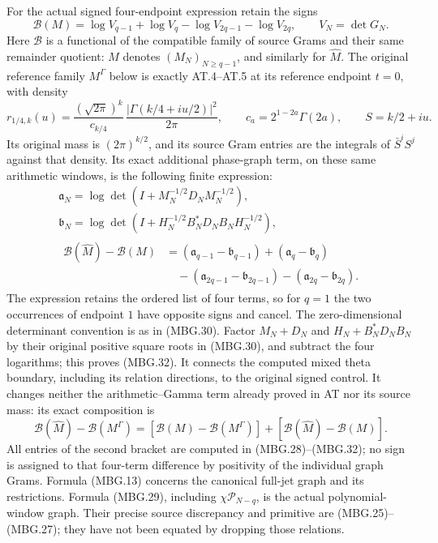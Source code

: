 For the actual signed four-endpoint expression retain the signs
\[
 \mathcal B(M)=
 \log V_{q-1}+\log V_q
                  -\log V_{2q-1}-\log V_{2q},\qquad V_N=\det G_N .
 \tag{MBG.31}\label{eq:mbg-signed-four}
\]
Here \(\mathcal B\) is a functional of the compatible family of
source Grams and their same remainder quotient: \(M\) denotes
\((M_N)_{N\ge q-1}\), and similarly for \(\widehat M\).
The original reference family \(M^\Gamma\) below is exactly
AT.4--AT.5 at its reference endpoint \(t=0\), with density
\[
 r_{1/4,k}(u)=\frac{(\sqrt{2\pi})^k}{c_{k/4}}\,
      \frac{|\Gamma(k/4+iu/2)|^2}{2\pi},
 \qquad c_a=2^{1-2a}\Gamma(2a),\qquad S=k/2+iu.
 \tag{MBG.31a}\label{eq:mbg-Gamma-reference}
\]
Its original mass is \((2\pi)^{k/2}\), and its source Gram entries
are the integrals of \(\bar S^iS^j\) against that density.
Its exact additional phase-graph term, on these same arithmetic
windows, is the following finite expression:
\[
 \begin{gathered}
 \mathfrak a_N=\log\det(I+M_N^{-1/2}D_NM_N^{-1/2}),\\
 \mathfrak b_N=\log\det(I+H_N^{-1/2}B_N^*D_NB_NH_N^{-1/2}),\\
 \begin{aligned}
 \mathcal B(\widehat M)-\mathcal B(M)
 &= (\mathfrak a_{q-1}-\mathfrak b_{q-1})
       +(\mathfrak a_q-\mathfrak b_q)\\
 &\quad-(\mathfrak a_{2q-1}-\mathfrak b_{2q-1})
       -(\mathfrak a_{2q}-\mathfrak b_{2q}).
 \end{aligned}
 \end{gathered}
 \tag{MBG.32}\label{eq:mbg-four-exact}
\]
The expression retains the ordered list of four terms, so for \(q=1\) the
two occurrences of endpoint \(1\) have opposite signs and cancel.
The zero-dimensional determinant convention is as in (MBG.30).
Factor \(M_N+D_N\) and
\(H_N+B_N^*D_NB_N\) by their original positive square roots in
(MBG.30), and subtract the four logarithms; this proves (MBG.32).
It connects the computed mixed theta boundary, including its
relation directions, to the original signed control.
It changes neither the arithmetic--Gamma term already proved in AT
nor its source mass: its exact composition is
\[
 \mathcal B(\widehat M)-\mathcal B(M^\Gamma)
 =[\mathcal B(M)-\mathcal B(M^\Gamma)]
                  +[\mathcal B(\widehat M)-\mathcal B(M)] .
 \tag{MBG.33}\label{eq:mbg-Gamma-composition}
\]
All entries of the second bracket are computed in (MBG.28)--(MBG.32);
no sign is assigned to that four-term difference by positivity of
the individual graph Grams. Formula (MBG.13) concerns the canonical
full-jet graph and its restrictions. Formula (MBG.29), including
\(\chi\mathcal P_{N-q}\), is the actual polynomial-window graph.
Their precise source discrepancy and primitive are (MBG.25)--(MBG.27);
they have not been equated by dropping those relations.

